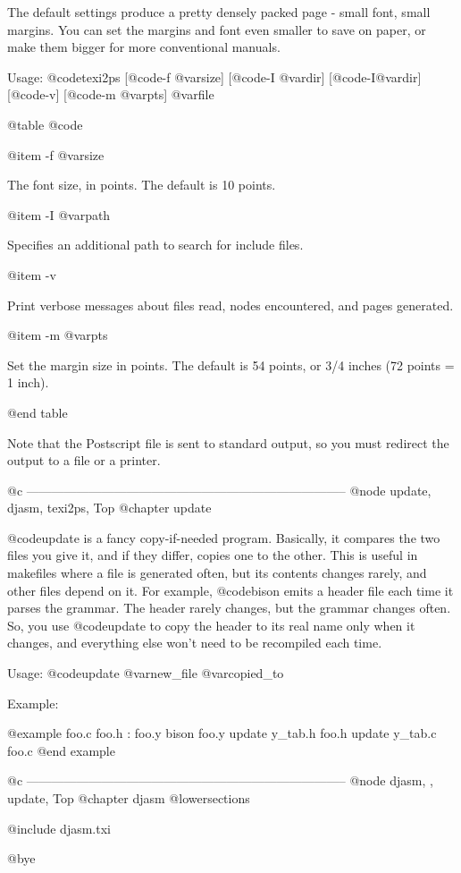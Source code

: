 The default settings produce a pretty densely packed page - small font,
small margins.  You can set the margins and font even smaller to save on
paper, or make them bigger for more conventional manuals.

Usage: @code{texi2ps} [@code{-f} @var{size}] [@code{-I} @var{dir}]
[@code{-I}@var{dir}] [@code{-v}] [@code{-m} @var{pts}] @var{file}

@table @code

@item -f @var{size}

The font size, in points.  The default is 10 points.

@item -I @var{path}

Specifies an additional path to search for include files.

@item -v

Print verbose messages about files read, nodes encountered, and pages
generated.

@item -m @var{pts}

Set the margin size in points.  The default is 54 points, or 3/4 inches
(72 points = 1 inch).

@end table

Note that the Postscript file is sent to standard output, so you must
redirect the output to a file or a printer.

@c -----------------------------------------------------------------------------
@node update, djasm, texi2ps, Top
@chapter update

@code{update} is a fancy copy-if-needed program.  Basically, it compares
the two files you give it, and if they differ, copies one to the other.
This is useful in makefiles where a file is generated often, but its
contents changes rarely, and other files depend on it.  For example,
@code{bison} emits a header file each time it parses the grammar.  The
header rarely changes, but the grammar changes often.  So, you use
@code{update} to copy the header to its real name only when it changes,
and everything else won't need to be recompiled each time.

Usage: @code{update} @var{new_file} @var{copied_to}

Example:

@example
foo.c foo.h : foo.y
        bison foo.y
        update y_tab.h foo.h
        update y_tab.c foo.c
@end example

@c -----------------------------------------------------------------------------
@node djasm, , update, Top
@chapter djasm
@lowersections

@include djasm.txi

@bye
